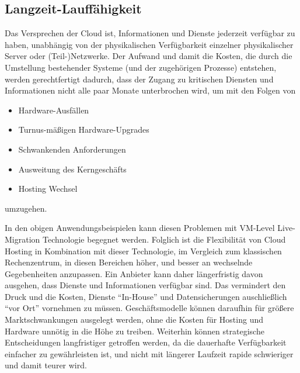 \subsection{Langzeit-Lauffähigkeit}
\label{sec:langz-lauff}
Das Versprechen der Cloud ist, Informationen und Dienste jederzeit
verfügbar zu haben, unabhängig von der physikalischen Verfügbarkeit
einzelner physikalischer Server oder (Teil-)Netzwerke. Der Aufwand und
damit die Kosten, die durch die Umstellung bestehender Systeme (und
der zugehörigen Prozesse) entstehen, werden gerechtfertigt dadurch,
dass der Zugang zu kritischen Diensten und Informationen nicht alle
paar Monate unterbrochen wird, um mit den Folgen von
\begin{itemize}
\item Hardware-Ausfällen
\item Turnus-mäßigen Hardware-Upgrades
\item Schwankenden Anforderungen
\item Ausweitung des Kerngeschäfts
\item Hosting Wechsel
\end{itemize}
umzugehen.

In den obigen Anwendungsbeispielen kann diesen Problemen mit VM-Level
Live-Migration Technologie begegnet werden. Folglich ist die
Flexibilität von Cloud Hosting in Kombination mit dieser Technologie,
im Vergleich zum klassischen Rechenzentrum, in diesen Bereichen höher,
und besser an wechselnde Gegebenheiten anzupassen. Ein Anbieter kann
daher längerfristig davon ausgehen, dass Dienste und Informationen
verfügbar sind. Das vermindert den Druck und die Kosten, Dienste
"`In-House"' und Datensicherungen auschließlich "`vor Ort"' vornehmen
zu müssen. Geschäftsmodelle können daraufhin für größere
Marktschwankungen ausgelegt werden, ohne die Kosten für Hosting und
Hardware unnötig in die Höhe zu treiben. Weiterhin können strategische
Entscheidungen langfristiger getroffen werden, da die dauerhafte
Verfügbarkeit einfacher zu gewährleisten ist, und nicht mit längerer
Laufzeit rapide schwieriger und damit teurer wird.


